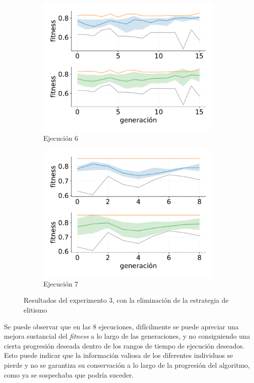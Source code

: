 \begin{figure}
\begin{subfigure}{0.47\textwidth}
        \includegraphics[width=\textwidth]{figuras/experimentos/exp_no_elitismo/no_elitismo_6.pdf}
        \caption{Ejecución 6}
    \end{subfigure}
    \hfill
    \begin{subfigure}{0.47\textwidth}
        \centering
        \includegraphics[width=\textwidth]{figuras/experimentos/exp_no_elitismo/no_elitismo_7.pdf}
        \caption{Ejecución 7}
    \end{subfigure}
    \hfill
\caption{Resultados del experimento 3, con la eliminación de la estrategia de elitismo}
\label{fig:exp_elitismo}
\end{figure}

Se puede observar que en las 8 ejecuciones, difícilmente se puede apreciar una mejora sustancial del \textit{fitness} a lo largo de las generaciones, y no consiguiendo una cierta progresión deseada dentro de los rangos de tiempo de ejecución deseados. Esto puede indicar que la información valiosa de los diferentes individuos se pierde y no se garantiza su conservación a lo largo de la progresión del algoritmo, como ya se sospechaba que podría suceder.


